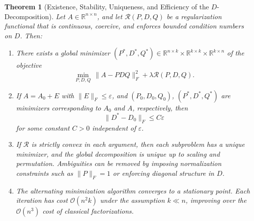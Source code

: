 \documentclass[10pt,a4paper]{article}
\newtheorem{theorem}{\bf Theorem}[section]
\begin{document}
\begin{theorem}[Existence, Stability, Uniqueness, and Efficiency of the $D$-Decomposition]
\label{thm:existence_stability}
Let \( A \in \mathbb{R}^{n \times n} \), and let \( \mathcal{R}(P, D, Q) \) be a regularization functional that is continuous, coercive, and enforces bounded condition numbers on \( D \). Then:
\begin{enumerate}
    \item[\textbf{(a)}] There exists a global minimizer \( (P^*, D^*, Q^*) \in \mathbb{R}^{n \times k} \times \mathbb{R}^{k \times k} \times \mathbb{R}^{k \times n} \) of the objective
    \[
    \min_{P, D, Q} \, \| A - P D Q \|_F^2 + \lambda \mathcal{R}(P, D, Q).
    \]

    \item[\textbf{(b)}] If \( A = A_0 + E \) with \( \|E\|_F \leq \varepsilon \), and \( (P_0, D_0, Q_0) \), \( (P^*, D^*, Q^*) \) are minimizers corresponding to \( A_0 \) and \( A \), respectively, then
    \[
    \| D^* - D_0 \|_F \leq C \varepsilon
    \]
    for some constant \( C > 0 \) independent of \( \varepsilon \).

    \item[\textbf{(c)}] If \( \mathcal{R} \) is strictly convex in each argument, then each subproblem has a unique minimizer, and the global decomposition is unique up to scaling and permutation. Ambiguities can be removed by imposing normalization constraints such as \( \|P\|_F = 1 \) or enforcing diagonal structure in \( D \).

    \item[\textbf{(d)}] The alternating minimization algorithm converges to a stationary point. Each iteration has cost \( \mathcal{O}(n^2 k) \) under the assumption \( k \ll n \), improving over the \( \mathcal{O}(n^3) \) cost of classical factorizations.
\end{enumerate}
\end{theorem}
\end{document}
